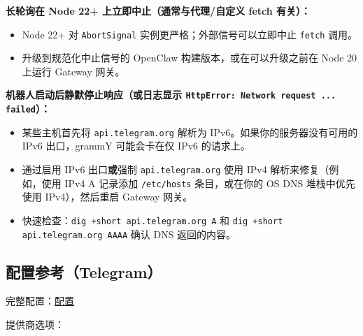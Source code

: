 \textbf{长轮询在 Node 22+ 上立即中止（通常与代理/自定义 fetch 有关）：}

\begin{itemize}
  \item Node 22+ 对 \texttt{AbortSignal} 实例更严格；外部信号可以立即中止 \texttt{fetch} 调用。
  \item 升级到规范化中止信号的 OpenClaw 构建版本，或在可以升级之前在 Node 20 上运行 Gateway 网关。
\end{itemize}


\textbf{机器人启动后静默停止响应（或日志显示 \texttt{HttpError: Network request ... failed}）：}

\begin{itemize}
  \item 某些主机首先将 \texttt{api.telegram.org} 解析为 IPv6。如果你的服务器没有可用的 IPv6 出口，grammY 可能会卡在仅 IPv6 的请求上。
  \item 通过启用 IPv6 出口\textbf{或}强制 \texttt{api.telegram.org} 使用 IPv4 解析来修复（例如，使用 IPv4 A 记录添加 \texttt{/etc/hosts} 条目，或在你的 OS DNS 堆栈中优先使用 IPv4），然后重启 Gateway 网关。
  \item 快速检查：\texttt{dig +short api.telegram.org A} 和 \texttt{dig +short api.telegram.org AAAA} 确认 DNS 返回的内容。
\end{itemize}


\subsection{配置参考（Telegram）}


完整配置：\href{/gateway/configuration}{配置}

提供商选项：

